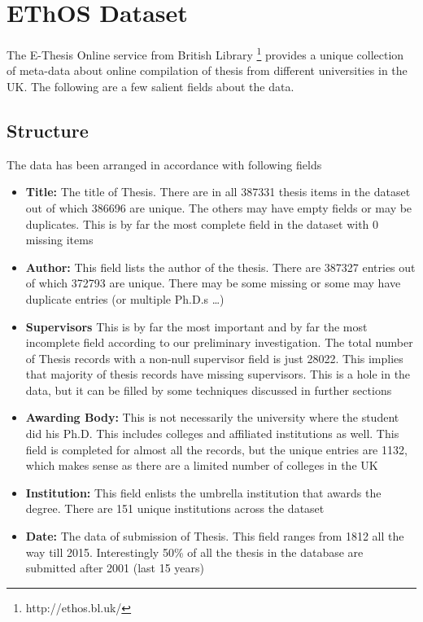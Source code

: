 \documentclass[a4paper]{article}
\begin{document}


\section{EThOS Dataset}

The E-Thesis Online service from British Library \footnote{http://ethos.bl.uk/} provides a unique collection of meta-data about online compilation of thesis from different universities in the UK. The following are a few salient fields about the data. 
\subsection{Structure}
The data has been arranged in accordance with following fields 
\begin{itemize}
\item \textbf{Title:} The title of Thesis. There are in all 387331 thesis items in the dataset out of which 386696 are unique. The others may have empty fields or may be duplicates. This is by far the most complete field in the dataset with 0 missing items
\item \textbf{Author:} This field lists the author of the thesis. There are 387327 entries out of which 372793 are unique. There may be some missing or some may have duplicate entries (or multiple Ph.D.s \dots) 
\item \textbf{Supervisors} This is by far the most important and by far the most incomplete field according to our preliminary investigation. The total number of Thesis records with a non-null supervisor field is just 28022. This implies that majority of thesis records have missing supervisors. This is a hole in the data, but it can be filled by some techniques discussed in further sections
\item \textbf{Awarding Body:} This is not necessarily the university where the student did his Ph.D. This includes colleges and affiliated institutions as well. This field is completed for almost all the records, but the unique entries are 1132, which makes sense as there are a limited number of colleges in the UK 
\item \textbf{Institution:} This field enlists the umbrella institution that awards the degree. There are 151 unique institutions across the dataset
\item \textbf{Date:} The data of submission of Thesis. This field ranges from 1812 all the way till 2015. Interestingly 50\% of all the thesis in the database are submitted after 2001 (last 15 years)

\end{itemize}
\end{document}

